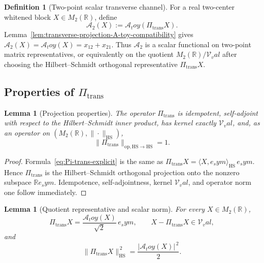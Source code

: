 \documentclass[11pt,a4paper]{amsart}
\def\toy{toy}%
\def\val{val}%
\def\sym{sym}%
\numberwithin{equation}{section}
\theoremstyle{plain}
\newtheorem{lemma}[theorem]{Lemma}
\theoremstyle{definition}
\newtheorem{definition}[theorem]{Definition}
\newcommand{\sym}{\mathrm{sym}}
\newcommand{\toy}{\mathrm{toy}}
\newcommand{\val}{\mathrm{val}}
\newcommand{\op}{\mathrm{op}}
\newcommand{\trans}{\mathrm{trans}}
\begin{document}
\begin{definition}[Two-point scalar transverse channel]
\label{def:two-point-scalar-transverse-channel}
For a real two-center whitened block \(X\in M_2(\mathbb R)\), define
\begin{equation}
\label{eq:two-point-scalar-channel}
        \mathcal A_2(X):=\mathcal A_\toy(\Pi_\trans X).
\end{equation}
Lemma~\ref{lem:transverse-projection-A-toy-compatibility} gives
\(\mathcal A_2(X)=\mathcal A_\toy(X)=x_{12}+x_{21}\).  Thus
\(\mathcal A_2\) is a scalar functional on two-point matrix
representatives, or equivalently on the quotient
\(M_2(\mathbb R)/\mathcal V_\val\) after choosing the
Hilbert--Schmidt orthogonal representative \(\Pi_\trans X\).
\end{definition}

\subsection{Properties of \(\Pi_\trans\)}
\label{subsec:transverse-projection-properties}

\begin{lemma}[Projection properties]
\label{lem:transverse-projection-properties}
The operator \(\Pi_\trans\) is idempotent, self-adjoint with respect
to the Hilbert--Schmidt inner product, has kernel exactly
\(\mathcal V_\val\), and, as an operator on
\((M_2(\mathbb R),\|\cdot\|_{\mathrm{HS}})\),
\begin{equation}
\label{eq:Pi-trans-norm}
        \|\Pi_\trans\|_{\op,\mathrm{HS}\to\mathrm{HS}}=1.
\end{equation}
\end{lemma}

\begin{proof}
Formula~\eqref{eq:Pi-trans-explicit} is the same as
\(\Pi_\trans X=\langle X,e_\sym\rangle_{\mathrm{HS}}\,e_\sym\).  Hence
\(\Pi_\trans\) is the Hilbert--Schmidt orthogonal projection onto the
nonzero subspace \(\mathbb R e_\sym\).  Idempotence,
self-adjointness, kernel \(\mathcal V_\val\), and operator norm one
follow immediately.
\end{proof}

\begin{lemma}[Quotient representative and scalar norm]
\label{lem:transverse-projection-quotient-representative}
For every \(X\in M_2(\mathbb R)\),
\begin{equation}
\label{eq:Pi-trans-representative}
        \Pi_\trans X=\frac{\mathcal A_\toy(X)}{\sqrt2}\,e_\sym,
        \qquad X-\Pi_\trans X\in\mathcal V_\val,
\end{equation}
and
\begin{equation}
\label{eq:Pi-trans-HS-norm-scalar}
        \|\Pi_\trans X\|_{\mathrm{HS}}^{\,2}
        =\frac{|\mathcal A_\toy(X)|^{\,2}}{2}.
\end{equation}
\end{lemma}
\end{document}
